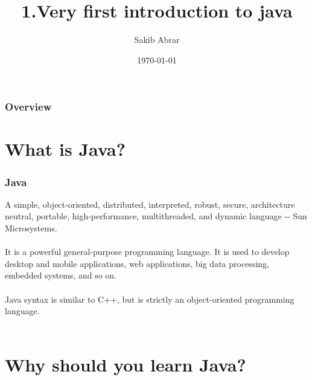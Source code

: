 \documentclass{beamer}
\title[Java]{1.Very first introduction to java} %
\author{Sakib Abrar} %
\institute[BUET] %
{
CSE\\~\\Bangladesh University of Engineering \& Technology \\ %
\medskip
\textit{sakib.cghs@gmail.com} %
}
\date{\today} %
\begin{document}
\begin{frame}
\titlepage %
\end{frame}

\begin{frame}
\frametitle{Overview} %
\tableofcontents %
\end{frame}


\section{What is Java?}

\begin{frame}
\frametitle{Java}
A simple, object‐oriented, distributed, interpreted,
robust, secure, architecture neutral, portable,
high‐performance, multithreaded, and dynamic
language ‐‐ Sun Microsystems.\\~\\
It is a powerful general-purpose programming language. It is used to develop desktop and mobile applications, web applications, big data processing, embedded systems, and so on.\\~\\
Java syntax is similar to C++, but is strictly an object-oriented programming language. \\~\\

\end{frame}

\section{Why should you learn Java?}
\end{document}
